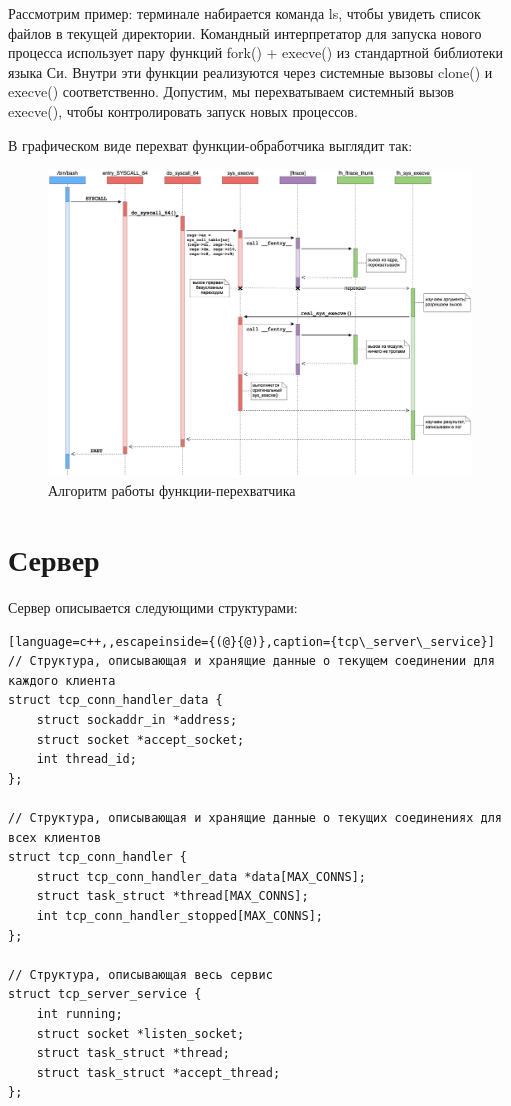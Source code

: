 Рассмотрим пример: терминале набирается команда ls, чтобы увидеть список файлов в текущей директории. Командный интерпретатор для запуска нового процесса использует пару функций fork() + execve() из стандартной библиотеки языка Си. Внутри эти функции реализуются через системные вызовы clone() и execve() соответственно. Допустим, мы перехватываем системный вызов execve(), чтобы контролировать запуск новых процессов.

В графическом виде перехват функции-обработчика выглядит так:
\begin{figure}[h!]
	\centering
	\includegraphics[width=1.0\textwidth]{img/hook_work_scheme.png}
	\caption{Алгоритм работы функции-перехватчика}
	\label{fig:spire00}
\end{figure}

\newpage
\section{Сервер}

Сервер описывается следующими структурами:
\begin{lstlisting}[language=c++,,escapeinside={(@}{@)},caption={tcp\_server\_service}]
// Структура, описывающая и хранящие данные о текущем соединении для каждого клиента
struct tcp_conn_handler_data {
	struct sockaddr_in *address;
	struct socket *accept_socket;
	int thread_id;
};

// Структура, описывающая и хранящие данные о текущих соединениях для всех клиентов
struct tcp_conn_handler {
	struct tcp_conn_handler_data *data[MAX_CONNS];
	struct task_struct *thread[MAX_CONNS];
	int tcp_conn_handler_stopped[MAX_CONNS];
};

// Структура, описывающая весь сервис
struct tcp_server_service {
	int running;
	struct socket *listen_socket;
	struct task_struct *thread;	
	struct task_struct *accept_thread;
};
\end{lstlisting}

